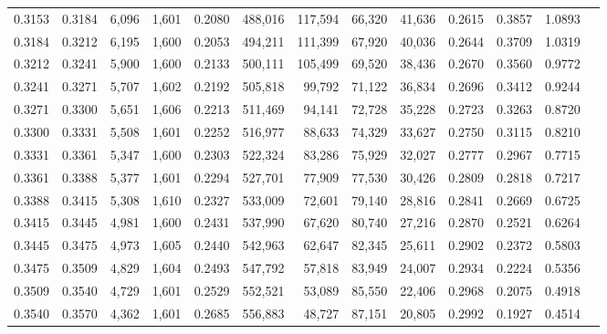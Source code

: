 \begin{tabular}{rrrrrrrrrrrrr}
0.3153 & 0.3184 &  6,096 & 1,601 &                                     0.2080 & 488,016 & 117,594 &  66,320 &  41,636 & 0.2615 & 0.3857 & 1.0893 \\
0.3184 & 0.3212 &  6,195 & 1,600 &                                     0.2053 & 494,211 & 111,399 &  67,920 &  40,036 & 0.2644 & 0.3709 & 1.0319 \\
0.3212 & 0.3241 &  5,900 & 1,600 &                                     0.2133 & 500,111 & 105,499 &  69,520 &  38,436 & 0.2670 & 0.3560 & 0.9772 \\
0.3241 & 0.3271 &  5,707 & 1,602 &                                     0.2192 & 505,818 &  99,792 &  71,122 &  36,834 & 0.2696 & 0.3412 & 0.9244 \\
0.3271 & 0.3300 &  5,651 & 1,606 &                                     0.2213 & 511,469 &  94,141 &  72,728 &  35,228 & 0.2723 & 0.3263 & 0.8720 \\
0.3300 & 0.3331 &  5,508 & 1,601 &                                     0.2252 & 516,977 &  88,633 &  74,329 &  33,627 & 0.2750 & 0.3115 & 0.8210 \\
0.3331 & 0.3361 &  5,347 & 1,600 &                                     0.2303 & 522,324 &  83,286 &  75,929 &  32,027 & 0.2777 & 0.2967 & 0.7715 \\
0.3361 & 0.3388 &  5,377 & 1,601 &                                     0.2294 & 527,701 &  77,909 &  77,530 &  30,426 & 0.2809 & 0.2818 & 0.7217 \\
0.3388 & 0.3415 &  5,308 & 1,610 &                                     0.2327 & 533,009 &  72,601 &  79,140 &  28,816 & 0.2841 & 0.2669 & 0.6725 \\
0.3415 & 0.3445 &  4,981 & 1,600 &                                     0.2431 & 537,990 &  67,620 &  80,740 &  27,216 & 0.2870 & 0.2521 & 0.6264 \\
0.3445 & 0.3475 &  4,973 & 1,605 &                                     0.2440 & 542,963 &  62,647 &  82,345 &  25,611 & 0.2902 & 0.2372 & 0.5803 \\
0.3475 & 0.3509 &  4,829 & 1,604 &                                     0.2493 & 547,792 &  57,818 &  83,949 &  24,007 & 0.2934 & 0.2224 & 0.5356 \\
0.3509 & 0.3540 &  4,729 & 1,601 &                                     0.2529 & 552,521 &  53,089 &  85,550 &  22,406 & 0.2968 & 0.2075 & 0.4918 \\
0.3540 & 0.3570 &  4,362 & 1,601 &                                     0.2685 & 556,883 &  48,727 &  87,151 &  20,805 & 0.2992 & 0.1927 & 0.4514 \\

\end{tabular}
